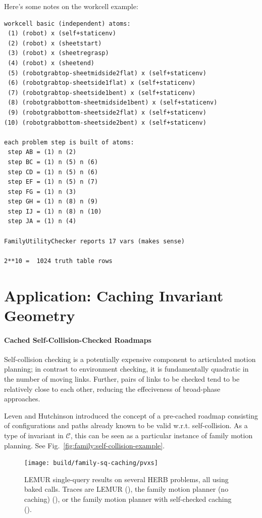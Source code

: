 Here's some notes on the workcell example:

\begin{verbatim}
workcell basic (independent) atoms:
 (1) (robot) x (self+staticenv)
 (2) (robot) x (sheetstart)
 (3) (robot) x (sheetregrasp)
 (4) (robot) x (sheetend)
 (5) (robotgrabtop-sheetmidside2flat) x (self+staticenv)
 (6) (robotgrabtop-sheetside1flat) x (self+staticenv)
 (7) (robotgrabtop-sheetside1bent) x (self+staticenv)
 (8) (robotgrabbottom-sheetmidside1bent) x (self+staticenv)
 (9) (robotgrabbottom-sheetside2flat) x (self+staticenv)
(10) (robotgrabbottom-sheetside2bent) x (self+staticenv)

each problem step is built of atoms:
 step AB = (1) n (2)
 step BC = (1) n (5) n (6)
 step CD = (1) n (5) n (6)
 step EF = (1) n (5) n (7)
 step FG = (1) n (3)
 step GH = (1) n (8) n (9)
 step IJ = (1) n (8) n (10)
 step JA = (1) n (4)

FamilyUtilityChecker reports 17 vars (makes sense)

2**10 =  1024 truth table rows
\end{verbatim}






\section{Application: Caching Invariant Geometry}
\label{subsec:family:cached-self-valid}

\paragraph{Cached Self-Collision-Checked Roadmaps}
Self-collision checking is a potentially expensive component to
articulated motion planning;
in contrast to environment checking,
it is fundamentally quadratic in the number of moving links.
Further, pairs of links to be checked
tend to be relatively close to each other,
reducing the effeciveness of broad-phase approaches.

Leven and Hutchinson \citep{leven2000changing}
introduced the concept of a pre-cached roadmap consisting of
configurations and paths already known to be valid w.r.t.
self-collision.
As a type of invariant in $\mathcal{C}$,
this can be seen as a particular instance of family motion planning.
See Fig.~\ref{fig:family:self-collision-example}.

\begin{figure}
   \centering   
   \texttt{[image: build/family-sq-caching/pvxs]}
   \caption[]{LEMUR single-query results on several HERB problems,
      all using baked calls.
      Traces are LEMUR
      (\protect{}),
      the family motion planner (no caching)
      (\protect{}),
      or the family motion planner with self-checked caching
      (\protect{}).}
\end{figure}





